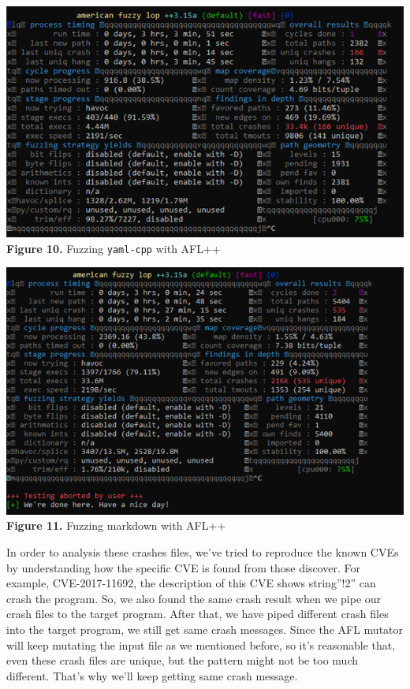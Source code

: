 \documentclass[12pt]{diazessay}
\begin{document}
\vspace{-6mm}
\begin{center}
	\includegraphics[scale=1.0, trim={0 0 7mm 0}, clip]{yamlfuzzer.png}\\
	\textbf{Figure 10.} Fuzzing \texttt{yaml-cpp} with AFL++\\
\end{center}



\vspace{6mm}
\begin{center}
	\includegraphics[scale=0.7, trim={0 0 1.5cm 0}, clip]{markdownfuzzer.png}\\
	\textbf{Figure 11.} Fuzzing markdown with AFL++\\
\end{center}
\vspace{6mm}




In order to analysis these crashes files, we've tried to reproduce the known CVEs by understanding how the specific CVE is found from those discover.
For example, CVE-2017-11692\cite{CVE-2017-11692}, the description of this CVE shows string”!2” can crash the program.
So, we also found the same crash result when we pipe our crash files to the target program.
After that, we have piped different crash files into the target program, we still get same crash messages.
Since the AFL mutator will keep mutating the input file as we mentioned before, so it's reasonable that, even these crash files are unique, but the pattern might not be too much different. That's why we'll keep getting same crash message.
\end{document}
